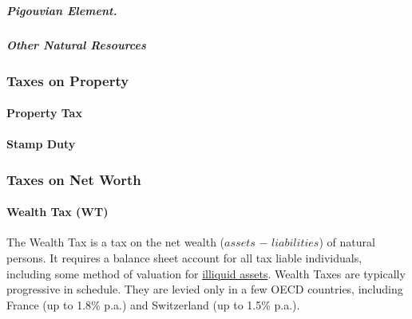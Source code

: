 \subparagraph{Pigouvian Element.} %

\subparagraph{Other Natural Resources}




\subsubsection{Taxes on Property}

\paragraph{Property Tax}
	\label{sec:PT}

\paragraph{Stamp Duty}
	\label{sec:SD}

\subsubsection{Taxes on Net Worth}

\paragraph{Wealth Tax (WT)}
	\label{sec:WT}
The Wealth Tax is a tax on the net wealth ($assets$ $-$ $liabilities$) of natural persons.
It requires a balance sheet account for all tax liable individuals, including some method of valuation for \hyperref[des:liquid-assets]{illiquid assets}.
Wealth Taxes are typically progressive in schedule.
They are levied only in a few OECD countries, including France (up to 1.8\% p.a.) and Switzerland (up to 1.5\% p.a.).

